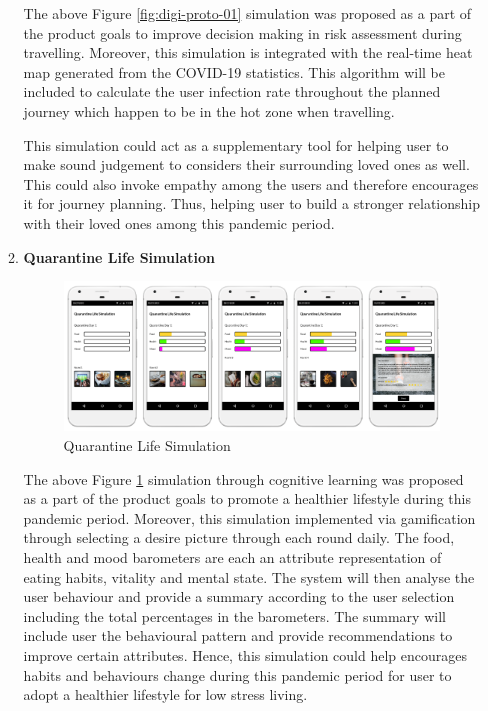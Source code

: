\begin{enumerate}[a)]
\begin{enumerate}[label=(\roman*)]
\begin{figure}[H]
            \end{figure}
            \par The above Figure \ref{fig:digi-proto-01} simulation was proposed as a part of the product goals to improve decision making in risk assessment during travelling. Moreover, this simulation is integrated with the real-time heat map generated from the COVID-19 statistics. This algorithm will be included to calculate the user infection rate throughout the planned journey which happen to be in the hot zone when travelling.
            \par This simulation could act as a supplementary tool for helping user to make sound judgement to considers their surrounding loved ones as well. This could also invoke empathy among the users and therefore encourages it for journey planning. Thus, helping user to build a stronger relationship with their loved ones among this pandemic period.
          \item \textbf{Quarantine Life Simulation}
            \begin{figure}[H]
              \centering
              \includegraphics[scale=1]{img/digital-prototype/quarantine-life.png}
              \caption{Quarantine Life Simulation}
              \label{fig:digi-proto-02}
            \end{figure}
            \par The above Figure \ref{fig:digi-proto-02} simulation through cognitive learning was proposed as a part of the product goals to promote a healthier lifestyle during this pandemic period. Moreover, this simulation implemented via gamification through selecting a desire picture through each round daily. The food, health and mood barometers are each an attribute representation of eating habits, vitality and mental state. The system will then analyse the user behaviour and provide a summary according to the user selection including the total percentages in the barometers. The summary will include user the behavioural pattern and provide recommendations to improve certain attributes. Hence, this simulation could help encourages habits and behaviours change during this pandemic period for user to adopt a healthier lifestyle for low stress living.

\end{enumerate}
\end{enumerate}
